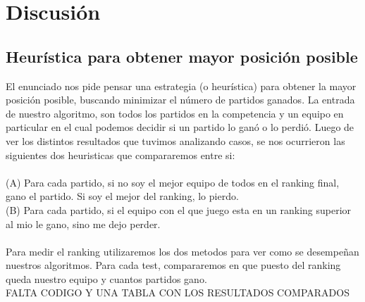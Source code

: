 \section{Discusi\'on}

\subsection{Heur\'istica para obtener mayor posici\'on posible}

El enunciado nos pide pensar una estrategia (o heur\'istica) para obtener la mayor posici\'on posible, buscando minimizar el n\'umero de partidos ganados. La entrada de nuestro algoritmo, son todos los partidos en la competencia y un equipo en particular en el cual podemos decidir si un partido lo gan\'o o lo perdi\'o. Luego de ver los distintos resultados que tuvimos analizando casos, se nos ocurrieron las siguientes dos heuristicas que compararemos entre si:\\
\\
(A) Para cada partido, si no soy el mejor equipo de todos en el ranking final, gano el partido. Si soy el mejor del ranking, lo pierdo.\\
(B) Para cada partido, si el equipo con el que juego esta en un ranking superior al mio le gano, sino me dejo perder.\\
\\
Para medir el ranking utilizaremos los dos metodos para ver como se desempe\~nan nuestros algoritmos. Para cada test, compararemos en que puesto del ranking queda nuestro equipo y cuantos partidos gano.\\
FALTA CODIGO Y UNA TABLA CON LOS RESULTADOS COMPARADOS\\